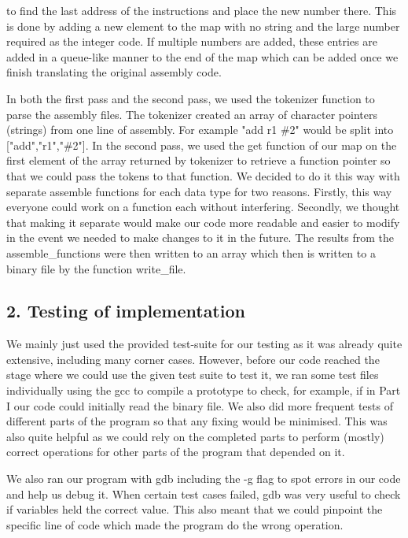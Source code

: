 \documentclass[a4paper]{article}
\begin{document}
to find the last address of the instructions and place the new number there. This is done by adding a new element
to the map with no string and the large number required as the integer code. If multiple numbers are added,
these entries are added in a queue-like manner to the end of the map which can be added once we finish 
translating the original assembly code.
\par
In both the first pass and the second pass, we used the tokenizer function to parse the assembly files. The tokenizer
created an array of character pointers (strings) from one line of assembly. For example "add r1 \#2" would be split
into ["add","r1","\#2"]. In the second pass, we used the get function of our map on the first element of the array
returned by tokenizer to retrieve a function pointer so that we could pass the tokens to that function. We decided
to do it this way with separate assemble functions for each data type for two reasons. Firstly, this way everyone
could work on a function each without interfering. Secondly, we thought that making it separate would make our
code more readable and easier to modify in the event we needed to make changes to it in the future. The results from
the assemble{\_}functions were then written to an array which then is written to a binary file by the function write{\_}file.


\bigskip
\bigskip

\subsection*{2. Testing of implementation}
We mainly just used the provided test-suite for our testing as it was already quite extensive, including many corner cases. 
However, before our code reached the stage where we could use the given test suite to test it, we ran some test files individually 
using the gcc to compile a prototype to check, for example, if in Part I our code could initially read the binary file. We also did more frequent 
tests of different parts of the program so that any fixing would be minimised. This was also quite helpful as we could
rely on the completed parts to perform (mostly) correct operations for other parts of the program that depended on it. 

We also ran our program with gdb including the -g flag to spot errors in our code and help us debug it. When certain test cases failed,
gdb was very useful to check if variables held the correct value. This also meant that we could pinpoint the specific line of code
which made the program do the wrong operation.
\end{document}
